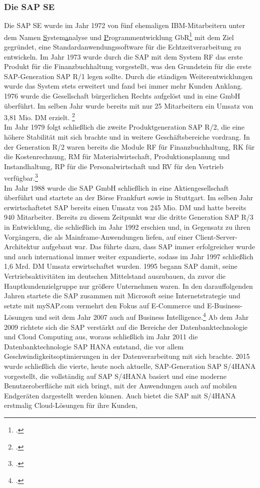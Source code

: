 \subsubsection{Die SAP SE}
Die SAP SE wurde im Jahr 1972 von fünf ehemaligen IBM-Mitarbeitern unter dem Namen \glqq{}\underline{S}ystem\underline{a}nalyse und \underline{P}rogrammentwicklung GbR\grqq{}\footcite[Vgl.][]{think-ing}  mit dem Ziel gegründet, eine Standardanwendungssoftware für die Echtzeitverarbeitung zu entwickeln.  Im Jahr 1973 wurde durch die SAP mit dem \glqq{}System RF\grqq{} das erste Produkt für die Finanzbuchhaltung vorgestellt, was den Grundstein für die erste SAP-Generation \glqq{}SAP R/1\grqq{} legen sollte. Durch die ständigen Weiterentwicklungen wurde das System stets erweitert und fand bei immer mehr Kunden Anklang. 1976 wurde die Gesellschaft bürgerlichen Rechts aufgelöst und in eine GmbH überführt. Im selben Jahr wurde bereits mit nur 25 Mitarbeitern ein Umsatz von 3,81 Mio. DM erzielt. \footcite[Vgl.][]{sap-fruehejahre}\\Im Jahr 1979 folgt schließlich die zweite Produktgeneration \glqq{}SAP R/2\grqq{}, die eine höhere Stabilität mit sich brachte und in weitere Geschäftsbereiche vordrang. In der Generation R/2 waren bereits die Module RF für Finanzbuchhaltung, RK für die Kostenrechnung, RM für Materialwirtschaft, Produktionsplanung und Instandhaltung, RP für die Personalwirtschaft und RV für den Vertrieb verfügbar.\footcite[Vgl.][]{bewerbungsratgeber}\\Im Jahr 1988 wurde die SAP GmbH schließlich in eine Aktiengesellschaft überführt und startete an der Börse Frankfurt sowie in Stuttgart. Im selben Jahr erwirtschaftetet SAP bereits einen Umsatz von 245 Mio. DM und hatte bereits 940 Mitarbeiter. Bereits zu diesem Zeitpunkt war die dritte Generation \glqq{}SAP R/3\grqq{} in Entwicklung, die schließlich im Jahr 1992 erschien und, in Gegensatz zu ihren Vorgängern, die als Mainframe-Anwendungen liefen, auf einer Client-Server-Architektur aufgebaut war. Das führte dazu, dass SAP immer erfolgreicher wurde und auch international immer weiter expandierte, sodass im Jahr 1997 schließlich 1,6 Mrd. DM  Umsatz erwirtschaftet wurden. 1995 begann SAP damit, seine Vertriebsaktivitäten im deutschen Mittelstand auszubauen, da zuvor die Hauptkundenzielgruppe nur größere Unternehmen waren. In den darauffolgenden Jahren startete die SAP zusammen mit Microsoft seine Internetstrategie und setzte mit \glqq{}mySAP.com\grqq{} vermehrt den Fokus auf E-Commerce und E-Business-Lösungen und seit dem Jahr 2007 auch auf Business Intelligence.\footcite[Vgl.][]{sap-fruehejahre} Ab dem Jahr 2009 richtete sich die SAP verstärkt auf die Bereiche der Datenbanktechnologie und Cloud Computing aus, woraus schließlich im Jahr 2011 die Datenbanktechnologie \glqq{}SAP HANA\grqq{} entstand, die vor allem Geschwindigkeitsoptimierungen in der Datenverarbeitung mit sich brachte. 2015 wurde schließlich die vierte, heute noch aktuelle, SAP-Generation \glqq{}SAP S/4HANA\grqq{} vorgestellt, die vollständig auf SAP S/4HANA basiert und eine moderne Benutzeroberfläche mit sich bringt, mit der Anwendungen auch auf mobilen Endgeräten dargestellt werden können. Auch bietet die SAP mit S/4HANA erstmalig Cloud-Lösungen für ihre Kunden, 